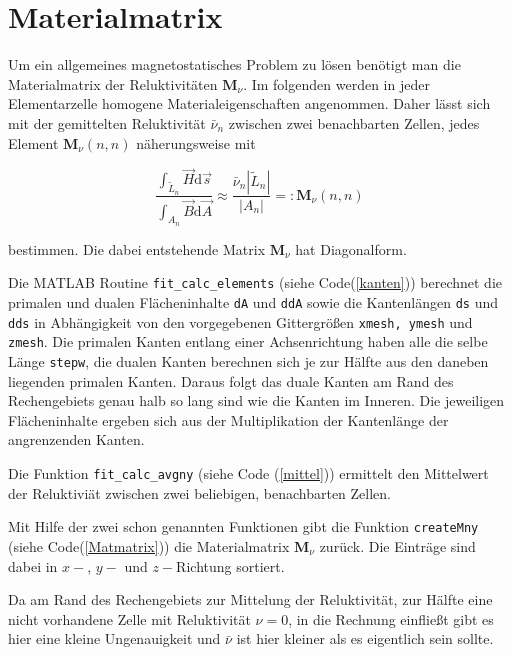 \section{Materialmatrix}

Um ein allgemeines magnetostatisches Problem zu lösen benötigt man die Materialmatrix der Reluktivitäten $\textbf{M}_\nu$. Im folgenden werden in jeder Elementarzelle homogene Materialeigenschaften angenommen. Daher lässt sich mit der gemittelten Reluktivität $\bar{\nu}_n$ zwischen zwei benachbarten Zellen, jedes Element $\textbf{M}_\nu (n,n)$ näherungsweise mit 

\begin{equation*}
	\frac{\int_{\tilde{L}_n} \vec{H} \mathrm{d}\vec{s}}{\int_{A_n} \vec{B} \mathrm{d}\vec{A}} \approx \frac{\bar{\nu}_n |\tilde{L}_n|}{|A_n|} =: \textbf{M}_\nu(n,n)
\end{equation*}

bestimmen.
Die dabei entstehende Matrix $\textbf{M}_\nu$ hat Diagonalform.

Die MATLAB Routine \texttt{fit\_calc\_elements} (siehe Code(\ref{kanten})) berechnet die primalen und dualen Flächeninhalte \texttt{dA} und \texttt{ddA} sowie die Kantenlängen \texttt{ds} und \texttt{dds} in Abhängigkeit von den vorgegebenen Gittergrößen \texttt{xmesh, ymesh} und \texttt{zmesh}. Die primalen Kanten entlang einer Achsenrichtung haben alle die selbe Länge \texttt{stepw}, die dualen Kanten berechnen sich je zur Hälfte aus den daneben liegenden primalen Kanten. Daraus folgt das duale Kanten am Rand des Rechengebiets genau halb so lang sind wie die Kanten im Inneren. Die jeweiligen Flächeninhalte ergeben sich aus der Multiplikation der Kantenlänge der angrenzenden Kanten. 

Die Funktion \texttt{fit\_calc\_avgny} (siehe Code (\ref{mittel})) ermittelt den Mittelwert der Reluktiviät zwischen zwei beliebigen, benachbarten Zellen.

Mit Hilfe der zwei schon genannten Funktionen gibt die Funktion \texttt{createMny} (siehe Code(\ref{Matmatrix})) die Materialmatrix $\textbf{M}_\nu$ zurück. Die Einträge sind dabei in $x-$, $y-$ und $z-$Richtung sortiert.

Da am Rand des Rechengebiets zur Mittelung der Reluktivität, zur Hälfte eine nicht vorhandene Zelle mit Reluktivität $\nu = 0$, in die Rechnung einfließt gibt es hier eine kleine Ungenauigkeit und $\bar{\nu}$ ist hier kleiner als es eigentlich sein sollte. 